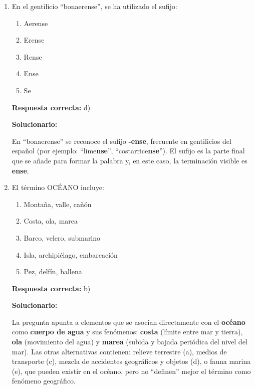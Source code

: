 \begin{enumerate}[resume]

\item En el gentilicio ``bonaerense'', se ha utilizado el sufijo:
\begin{enumerate}[label=\alph*)]
	\item Aerense
	\item Erense
	\item Rense
	\item Ense
	\item Se
\end{enumerate}

\textbf{Respuesta correcta:} d)

\vspace{2mm}
\textbf{Solucionario:}

En “bonaerense” se reconoce el sufijo \textbf{-ense}, frecuente en gentilicios del español (por ejemplo: “lime\textbf{nse}”, “costarrice\textbf{nse}”). 
El sufijo es la parte final que se añade para formar la palabra y, en este caso, la terminación visible es \textbf{ense}.


\item El término OCÉANO incluye:

\begin{enumerate}[label=\alph*)]
	\item Montaña, valle, cañón
	\item Costa, ola, marea
	\item Barco, velero, submarino
	\item Isla, archipiélago, embarcación
	\item Pez, delfín, ballena
\end{enumerate}

\textbf{Respuesta correcta:} b)

\vspace{2mm}
\textbf{Solucionario:}

La pregunta apunta a elementos que se asocian directamente con el \textbf{océano} como \textbf{cuerpo de agua} y sus fenómenos:
\textbf{costa} (límite entre mar y tierra), \textbf{ola} (movimiento del agua) y \textbf{marea} (subida y bajada periódica del nivel del mar).
Las otras alternativas contienen: relieve terrestre (a), medios de transporte (c), mezcla de accidentes geográficos y objetos (d), o fauna marina (e), que pueden existir en el océano, pero no “definen” mejor el término como fenómeno geográfico.



\end{enumerate}
